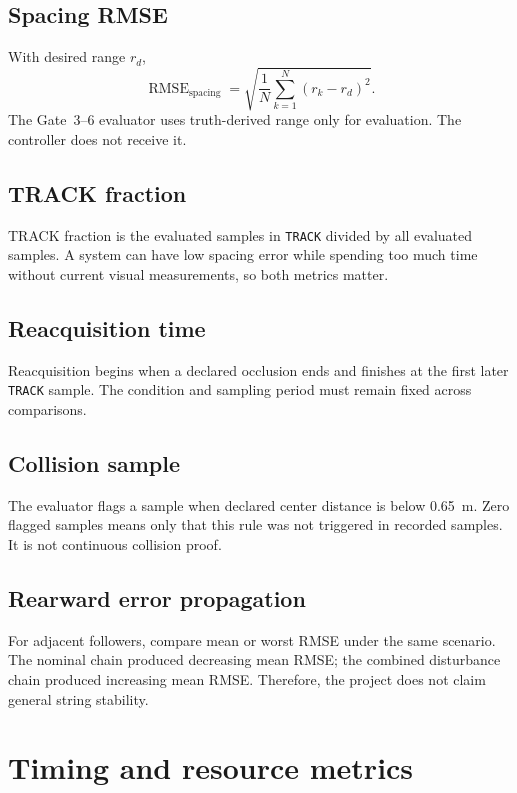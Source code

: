 \documentclass[11pt,oneside,openany]{book}
\newcommand{\state}[1]{\texttt{#1}}
\begin{document}
\section{Spacing RMSE}

With desired range $r_d$,
\begin{equation}
\operatorname{RMSE}_{\mathrm{spacing}}=
\sqrt{\frac{1}{N}\sum_{k=1}^{N}(r_k-r_d)^2}.
\end{equation}
The Gate~3--6 evaluator uses truth-derived range only for evaluation. The controller does not receive it.

\section{TRACK fraction}

TRACK fraction is the evaluated samples in \state{TRACK} divided by all evaluated samples. A system can have low spacing error while spending too much time without current visual measurements, so both metrics matter.

\section{Reacquisition time}

Reacquisition begins when a declared occlusion ends and finishes at the first later \state{TRACK} sample. The condition and sampling period must remain fixed across comparisons.

\section{Collision sample}

The evaluator flags a sample when declared center distance is below 0.65~m. Zero flagged samples means only that this rule was not triggered in recorded samples. It is not continuous collision proof.

\section{Rearward error propagation}

For adjacent followers, compare mean or worst RMSE under the same scenario. The nominal chain produced decreasing mean RMSE; the combined disturbance chain produced increasing mean RMSE. Therefore, the project does not claim general string stability.

\chapter{Timing and resource metrics}
\end{document}
